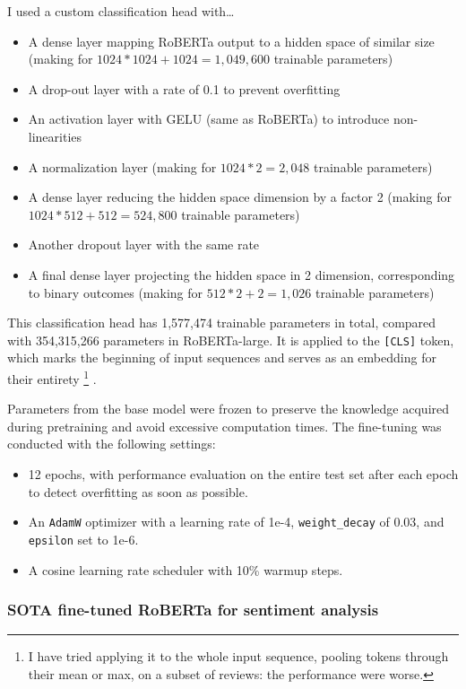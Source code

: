 \documentclass{article}
\begin{document}
I used a custom classification head with… 
\begin{itemize}
    \item A dense layer mapping RoBERTa output to a hidden space of similar size (making for \( 1024*1024+1024=1,049,600 \) trainable parameters)
	\item A drop-out layer with a rate of 0.1 to prevent overfitting
	\item An activation layer with GELU (same as RoBERTa) to introduce non-linearities
	\item A normalization layer (making for \( 1024*2=2,048 \) trainable parameters)
	\item A dense layer reducing the hidden space dimension by a factor 2 (making for \(1024*512+512=524,800\) trainable parameters)
	\item Another dropout layer with the same rate
	\item A final dense layer projecting the hidden space in 2 dimension, corresponding to binary outcomes (making for \(512*2+2=1,026\) trainable parameters)
\end{itemize}
This classification head has 1,577,474 trainable parameters in total, compared with 354,315,266 parameters in RoBERTa-large. It is applied to the \texttt{[CLS]} token, which marks the beginning of input sequences and serves as an embedding for their entirety
\footnote{I have tried applying it to the whole input sequence, pooling tokens through their mean or max, on a subset of reviews: the performance were worse.}
.

Parameters from the base model were frozen to preserve the knowledge acquired during pretraining and avoid excessive computation times. The fine-tuning was conducted with the following settings:
\begin{itemize}
    \item 12 epochs, with performance evaluation on the entire test set after each epoch to detect overfitting as soon as possible.
	\item An \texttt{AdamW} optimizer with a learning rate of 1e-4, \texttt{weight\_decay} of 0.03, and \texttt{epsilon} set to 1e-6.
    \item A cosine learning rate scheduler with 10\% warmup steps.
\end{itemize}

\subsubsection{SOTA fine-tuned RoBERTa for sentiment analysis}
\end{document}
